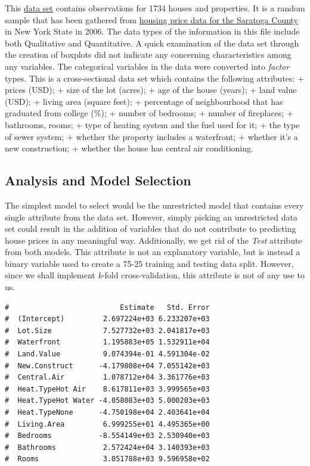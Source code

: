 \documentclass[letterpaper,9pt,twocolumn,twoside,]{pinp}
\begin{document}
This
\href{https://dasl.datadescription.com/datafile/housing-prices-ge19}{data
set} contains observations for 1734 houses and properties. It is a
random sample that has been gathered from
\href{https://rdrr.io/cran/mosaicData/man/SaratogaHouses.html}{housing
price data for the Saratoga County} in New York State in 2006. The data
types of the information in this file include both Qualitative and
Quantitative. A quick examination of the data set through the creation
of boxplots did not indicate any concerning characteristics among any
variables. The categorical variables in the data were converted into
\emph{factor} types. This is a cross-sectional data set which contains
the following attributes: + prices (USD); + size of the lot (acres); +
age of the house (years); + land value (USD); + living area (square
feet); + percentage of neighbourhood that has graduated from college
(\%); + number of bedrooms; + number of fireplaces; + bathrooms, rooms;
+ type of heating system and the fuel used for it; + the type of sewer
system; + whether the property includes a waterfront; + whether it's a
new construction; + whether the house has central air conditioning.

\hypertarget{analysis-and-model-selection}{%
\subsection{\texorpdfstring{\textbf{Analysis and Model
Selection}}{Analysis and Model Selection}}\label{analysis-and-model-selection}}

The simplest model to select would be the unrestricted model that
contains every single attribute from the data set. However, simply
picking an unrestricted data set could result in the addition of
variables that do not contribute to predicting house prices in any
meaningful way. Additionally, we get rid of the \emph{Test} attribute
from both models. This attribute is not an explanatory variable, but is
instead a binary variable used to create a 75-25 training and testing
data split. However, since we shall implement \emph{k}-fold
cross-validation, this attribute is not of any use to us.

\begin{ShadedResult}
\begin{verbatim}
#                          Estimate   Std. Error
#  (Intercept)         2.697224e+03 6.233207e+03
#  Lot.Size            7.527732e+03 2.041817e+03
#  Waterfront          1.195883e+05 1.532911e+04
#  Land.Value          9.074394e-01 4.591304e-02
#  New.Construct      -4.179808e+04 7.055142e+03
#  Central.Air         1.078712e+04 3.361776e+03
#  Heat.TypeHot Air    8.617811e+03 3.999565e+03
#  Heat.TypeHot Water -4.058083e+03 5.000203e+03
#  Heat.TypeNone      -4.750198e+04 2.403641e+04
#  Living.Area         6.999255e+01 4.495365e+00
#  Bedrooms           -8.554149e+03 2.530940e+03
#  Bathrooms           2.572424e+04 3.140393e+03
#  Rooms               3.051788e+03 9.596958e+02
\end{verbatim}
\end{ShadedResult}
\end{document}
